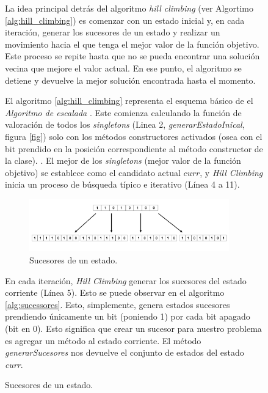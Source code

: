 \begin{figure}[H]

La idea principal detrás del algoritmo \emph{hill climbing} (ver Algortimo \ref{alg:hill_climbing}) es comenzar con un estado inicial y, en cada iteración, generar los sucesores de un estado y realizar un movimiento hacia el que tenga el mejor valor de la función objetivo. Este proceso se repite hasta que no se pueda encontrar una solución vecina que mejore el valor actual. En ese punto, el algoritmo se detiene y devuelve la mejor solución encontrada hasta el momento. 


El algoritmo \ref{alg:hill_climbing} representa el esquema básico de el \emph{Algoritmo de escalada} \cite{}.
Este comienza calculando la función de valoración de todos los \emph{singletons} (Linea 2, \emph{generarEstadoInical}, figura \ref{fig}) solo con los métodos constructores activados (osea con el bit prendido en la posición correspondiente al método constructor de la clase).
 . 
 El mejor de los \emph{singletons} (mejor valor de la función objetivo) se establece como el candidato actual $curr$, y \emph{Hill Climbing} inicia un proceso de búsqueda típico e iterativo (Línea 4 a 11). 

 \begin{figure}[H]
  \centering
  \includegraphics[width=0.95\textwidth]{images/succesores.png}
  \caption{Sucesores de un estado.}
  \label{fig:ncl-instances-intro}
\end{figure}

En cada iteración, \emph{Hill Climbing} generar los sucesores del estado corriente (Línea 5). Esto se puede observar en el algoritmo \ref{alg:sucessores}. 
Esto, simplemente, genera estados sucesores prendiendo únicamente un bit (poniendo 1) por cada bit apagado (bit en 0). 
Esto significa que crear un sucesor para nuestro problema es agregar un método al estado corriente. El método \emph{generarSucesores} nos devuelve el conjunto de estados del estado \emph{curr}. 


\end{figure}
